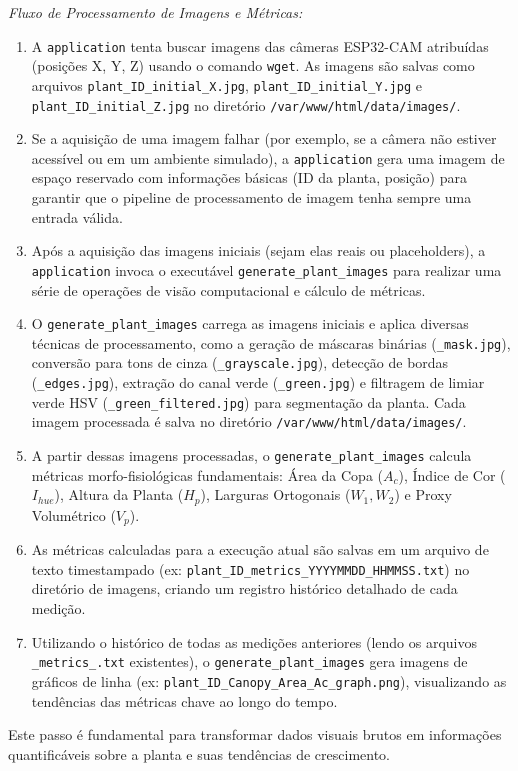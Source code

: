 \documentclass[12pt, a4paper]{article}
\begin{document}
	\textit{Fluxo de Processamento de Imagens e Métricas:}
	\begin{enumerate}
		\item A \texttt{application} tenta buscar imagens das câmeras ESP32-CAM atribuídas (posições X, Y, Z) usando o comando \texttt{wget}. As imagens são salvas como arquivos \texttt{plant\_ID\_initial\_X.jpg}, \texttt{plant\_ID\_initial\_Y.jpg} e \texttt{plant\_ID\_initial\_Z.jpg} no diretório \texttt{/var/www/html/data/images/}.
		\item Se a aquisição de uma imagem falhar (por exemplo, se a câmera não estiver acessível ou em um ambiente simulado), a \texttt{application} gera uma imagem de espaço reservado com informações básicas (ID da planta, posição) para garantir que o pipeline de processamento de imagem tenha sempre uma entrada válida.
		\item Após a aquisição das imagens iniciais (sejam elas reais ou placeholders), a \texttt{application} invoca o executável \texttt{generate\_plant\_images} para realizar uma série de operações de visão computacional e cálculo de métricas.
		\item O \texttt{generate\_plant\_images} carrega as imagens iniciais e aplica diversas técnicas de processamento, como a geração de máscaras binárias (\texttt{\_mask.jpg}), conversão para tons de cinza (\texttt{\_grayscale.jpg}), detecção de bordas (\texttt{\_edges.jpg}), extração do canal verde (\texttt{\_green.jpg}) e filtragem de limiar verde HSV (\texttt{\_green\_filtered.jpg}) para segmentação da planta. Cada imagem processada é salva no diretório \texttt{/var/www/html/data/images/}.
		\item A partir dessas imagens processadas, o \texttt{generate\_plant\_images} calcula métricas morfo-fisiológicas fundamentais: Área da Copa ($A_c$), Índice de Cor ($I_{hue}$), Altura da Planta ($H_p$), Larguras Ortogonais ($W_1, W_2$) e Proxy Volumétrico ($V_p$).
		\item As métricas calculadas para a execução atual são salvas em um arquivo de texto timestampado (ex: \texttt{plant\_ID\_metrics\_YYYYMMDD\_HHMMSS.txt}) no diretório de imagens, criando um registro histórico detalhado de cada medição.
		\item Utilizando o histórico de todas as medições anteriores (lendo os arquivos \texttt{\_metrics\_.txt} existentes), o \texttt{generate\_plant\_images} gera imagens de gráficos de linha (ex: \texttt{plant\_ID\_Canopy\_Area\_Ac\_graph.png}), visualizando as tendências das métricas chave ao longo do tempo.
	\end{enumerate}
	Este passo é fundamental para transformar dados visuais brutos em informações quantificáveis sobre a planta e suas tendências de crescimento.
	
\end{document}
